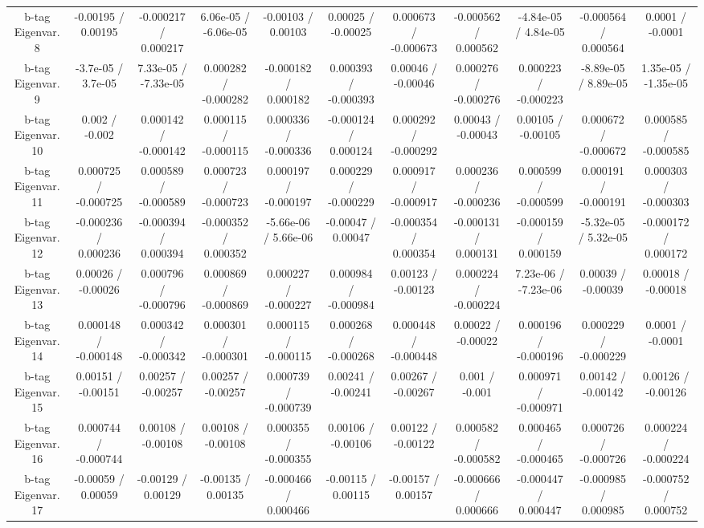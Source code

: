\begin{table}[htbp]
\begin{center}
\begin{tabular}{|c|c|c|c|c|c|c|c|c|c|c|}
  b-tag Eigenvar. 8 & -0.00195 / 0.00195 & -0.000217 / 0.000217 & 6.06e-05 / -6.06e-05 & -0.00103 / 0.00103 & 0.00025 / -0.00025 & 0.000673 / -0.000673 & -0.000562 / 0.000562 & -4.84e-05 / 4.84e-05 & -0.000564 / 0.000564 & 0.0001 / -0.0001 \\ 
  b-tag Eigenvar. 9 & -3.7e-05 / 3.7e-05 & 7.33e-05 / -7.33e-05 & 0.000282 / -0.000282 & -0.000182 / 0.000182 & 0.000393 / -0.000393 & 0.00046 / -0.00046 & 0.000276 / -0.000276 & 0.000223 / -0.000223 & -8.89e-05 / 8.89e-05 & 1.35e-05 / -1.35e-05 \\ 
  b-tag Eigenvar. 10 & 0.002 / -0.002 & 0.000142 / -0.000142 & 0.000115 / -0.000115 & 0.000336 / -0.000336 & -0.000124 / 0.000124 & 0.000292 / -0.000292 & 0.00043 / -0.00043 & 0.00105 / -0.00105 & 0.000672 / -0.000672 & 0.000585 / -0.000585 \\ 
  b-tag Eigenvar. 11 & 0.000725 / -0.000725 & 0.000589 / -0.000589 & 0.000723 / -0.000723 & 0.000197 / -0.000197 & 0.000229 / -0.000229 & 0.000917 / -0.000917 & 0.000236 / -0.000236 & 0.000599 / -0.000599 & 0.000191 / -0.000191 & 0.000303 / -0.000303 \\ 
  b-tag Eigenvar. 12 & -0.000236 / 0.000236 & -0.000394 / 0.000394 & -0.000352 / 0.000352 & -5.66e-06 / 5.66e-06 & -0.00047 / 0.00047 & -0.000354 / 0.000354 & -0.000131 / 0.000131 & -0.000159 / 0.000159 & -5.32e-05 / 5.32e-05 & -0.000172 / 0.000172 \\ 
  b-tag Eigenvar. 13 & 0.00026 / -0.00026 & 0.000796 / -0.000796 & 0.000869 / -0.000869 & 0.000227 / -0.000227 & 0.000984 / -0.000984 & 0.00123 / -0.00123 & 0.000224 / -0.000224 & 7.23e-06 / -7.23e-06 & 0.00039 / -0.00039 & 0.00018 / -0.00018 \\ 
  b-tag Eigenvar. 14 & 0.000148 / -0.000148 & 0.000342 / -0.000342 & 0.000301 / -0.000301 & 0.000115 / -0.000115 & 0.000268 / -0.000268 & 0.000448 / -0.000448 & 0.00022 / -0.00022 & 0.000196 / -0.000196 & 0.000229 / -0.000229 & 0.0001 / -0.0001 \\ 
  b-tag Eigenvar. 15 & 0.00151 / -0.00151 & 0.00257 / -0.00257 & 0.00257 / -0.00257 & 0.000739 / -0.000739 & 0.00241 / -0.00241 & 0.00267 / -0.00267 & 0.001 / -0.001 & 0.000971 / -0.000971 & 0.00142 / -0.00142 & 0.00126 / -0.00126 \\ 
  b-tag Eigenvar. 16 & 0.000744 / -0.000744 & 0.00108 / -0.00108 & 0.00108 / -0.00108 & 0.000355 / -0.000355 & 0.00106 / -0.00106 & 0.00122 / -0.00122 & 0.000582 / -0.000582 & 0.000465 / -0.000465 & 0.000726 / -0.000726 & 0.000224 / -0.000224 \\ 
  b-tag Eigenvar. 17 & -0.00059 / 0.00059 & -0.00129 / 0.00129 & -0.00135 / 0.00135 & -0.000466 / 0.000466 & -0.00115 / 0.00115 & -0.00157 / 0.00157 & -0.000666 / 0.000666 & -0.000447 / 0.000447 & -0.000985 / 0.000985 & -0.000752 / 0.000752 \\ 

\end{tabular}
\end{center}
\end{table}
